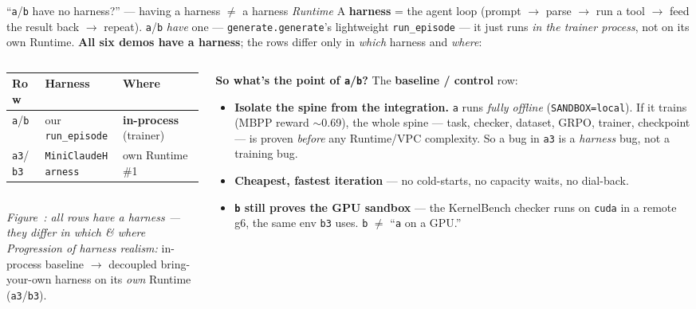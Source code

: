 \documentclass[aspectratio=169]{beamer}
\newcounter{deckfig}
\newcommand{\figtag}[1]{\refstepcounter{deckfig}%
  {\scriptsize\itshape Figure~\thedeckfig: #1}}
\begin{document}
\begin{frame}{``\texttt{a}/\texttt{b} have no harness?'' --- having a harness $\neq$ a harness \emph{Runtime}}
  \footnotesize A \textbf{harness} = the agent loop (prompt $\to$ parse $\to$ run a tool $\to$ feed the
  result back $\to$ repeat). \texttt{a}/\texttt{b} \emph{have} one --- \texttt{generate.generate}'s
  lightweight \texttt{run\_episode} --- it just runs \emph{in the trainer process}, not on its own
  Runtime. \textbf{All six demos have a harness}; the rows differ only in \emph{which} harness and \emph{where}:
  \vspace{0.2em}
  \begin{columns}[T]
    \begin{column}{0.5\textwidth}
      \centering
      \renewcommand{\arraystretch}{1.25}\scriptsize
      \begin{tabular}{lll}
        \toprule
        \textbf{Row} & \textbf{Harness} & \textbf{Where} \\
        \midrule
        \texttt{a}/\texttt{b}   & our \texttt{run\_episode}     & \textbf{in-process} (trainer) \\
        \texttt{a3}/\texttt{b3} & \texttt{MiniClaudeHarness}     & own Runtime \#1 \\
        \bottomrule
      \end{tabular}
      \\[0.3em]\figtag{all rows have a harness --- they differ in which \& where}
      \\[0.4em]
      {\scriptsize \emph{Progression of harness realism:} in-process baseline $\to$ decoupled
      bring-your-own harness on its \emph{own} Runtime (\texttt{a3}/\texttt{b3}).}
    \end{column}
    \begin{column}{0.5\textwidth}
      \textbf{So what's the point of \texttt{a}/\texttt{b}?} The \textbf{baseline / control} row:
      \begin{itemize}\setlength\itemsep{0.15em}
        \item \textbf{Isolate the spine from the integration.} \texttt{a} runs \emph{fully offline}
          (\texttt{SANDBOX=local}). If it trains (MBPP reward $\sim$0.69), the whole spine ---
          task, checker, dataset, GRPO, trainer, checkpoint --- is proven \emph{before} any
          Runtime/VPC complexity. So a bug in \texttt{a3} is a \emph{harness} bug, not a training bug.
        \item \textbf{Cheapest, fastest iteration} --- no cold-starts, no capacity waits, no dial-back.
        \item \textbf{\texttt{b} still proves the GPU sandbox} --- the KernelBench checker runs on
          \texttt{cuda} in a remote g6, the same env \texttt{b3} uses. \texttt{b} $\neq$ ``\texttt{a} on a GPU.''
      \end{itemize}
    \end{column}
  \end{columns}
\end{frame}
\end{document}
